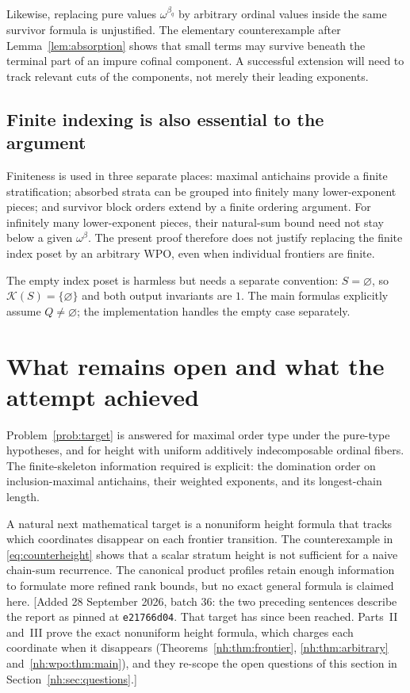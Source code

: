 \documentclass[11pt,a4paper]{article}
\theoremstyle{definition}
\theoremstyle{remark}
\newcommand{\K}{\mathcal K}
\begin{document}
Likewise, replacing pure values $\omega^{\beta_q}$ by arbitrary ordinal
values inside the same survivor formula is unjustified. The elementary
counterexample after Lemma~\ref{lem:absorption} shows that small terms may
survive beneath the terminal part of an impure cofinal component. A
successful extension will need to track relevant cuts of the components,
not merely their leading exponents.

\subsection{Finite indexing is also essential to the argument}

Finiteness is used in three separate places: maximal antichains provide a
finite stratification; absorbed strata can be grouped into finitely many
lower-exponent pieces; and survivor block orders extend by a finite
ordering argument. For infinitely many lower-exponent pieces, their
natural-sum bound need not stay below a given $\omega^\beta$. The present
proof therefore does not justify replacing the finite index poset by an
arbitrary WPO, even when individual frontiers are finite.

The empty index poset is harmless but needs a separate convention:
$S=\varnothing$, so $\K(S)=\{\varnothing\}$ and both output invariants
are $1$. The main formulas explicitly assume $Q\ne\varnothing$; the
implementation handles the empty case separately.

\section{What remains open and what the attempt achieved}\label{nh:sec:remainedopen}

Problem~\ref{prob:target} is answered for maximal order type under the
pure-type hypotheses, and for height with uniform additively
indecomposable ordinal fibers. The finite-skeleton information required
is explicit: the domination order on inclusion-maximal antichains, their
weighted exponents, and its longest-chain length.

A natural next mathematical target is a nonuniform height formula that
tracks which coordinates disappear on each frontier transition. The
counterexample in \eqref{eq:counterheight} shows that a scalar stratum
height is not sufficient for a naive chain-sum recurrence. The canonical
product profiles retain enough information to formulate more refined
rank bounds, but no exact general formula is claimed here.
[Added 28 September 2026, batch 36: the two preceding sentences describe
the report as pinned at \texttt{e21766d04}. That target has since been
reached. Parts~II and~III prove the exact nonuniform height formula, which
charges each coordinate when it disappears
(Theorems~\ref{nh:thm:frontier}, \ref{nh:thm:arbitrary}
and~\ref{nh:wpo:thm:main}), and they re-scope the open questions of this
section in Section~\ref{nh:sec:questions}.]
\end{document}
